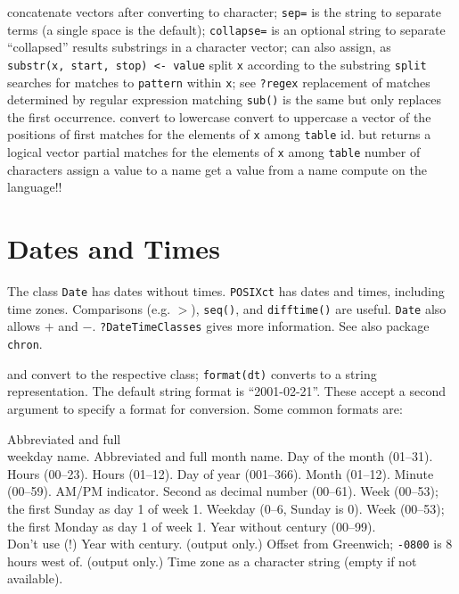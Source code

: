 	{concatenate vectors after converting to character; {\tt sep=} is the string to separate terms (a single space is the default); {\tt collapse=} is an optional string to separate ``collapsed'' results}
	{substrings in a character vector; can also assign, as\\ {\tt substr(x, start, stop) <- value}}
	{split {\tt x} according to the substring {\tt split}}
	{searches for matches to {\tt pattern} within {\tt x}; see {\tt ?regex}}
	{replacement of matches determined by regular expression matching {\tt sub()} is the same but only replaces the first occurrence.}
	{convert to lowercase}
	{convert to uppercase}
	{a vector of the positions of first matches for the elements of {\tt x} among {\tt table}}
	{id. but returns a logical vector}
	{partial matches for the elements of {\tt x} among {\tt table}}
	{number of characters}
	{assign a value to a name}
	{get a value from a name}
	{compute on the language!!}

\section{Dates and Times}{}

The class {\tt Date} has dates without times.  {\tt POSIXct} has
dates and times, including time zones. Comparisons (e.g. $>$),
{\tt seq()}, and {\tt difftime()} are useful. {\tt Date} also allows
$+$ and $-$. {\tt ?DateTimeClasses} gives more information. See also package
{\tt chron}.

	{and}
	{convert to the respective class; {\tt format(dt)} converts to a string representation. The default string format is ``2001-02-21''. These accept a second argument to specify a format for conversion. Some common formats are:}


    	{Abbreviated and full \\weekday name.}
    	{Abbreviated and full month name.}
    	{Day of the month (01--31).}
    	{Hours (00--23).}
    	{Hours (01--12).}
    	{Day of year (001--366).}
    	{Month (01--12).}
    	{Minute (00--59).}
    	{AM/PM indicator. }
    	{Second as decimal number (00--61).}
    	{Week (00--53); the first Sunday as day 1 of week 1.}
    	{Weekday (0--6, Sunday is 0).}
    	{Week (00--53); the first Monday as day 1 of week 1.}
    	{Year without century (00--99).\\Don't use (!)}
    	{Year with century.}
    	{(output only.) Offset from Greenwich; {\tt -0800} is 8 hours west of.}
    	{(output only.) Time zone as a character
      string (empty if not available).}

